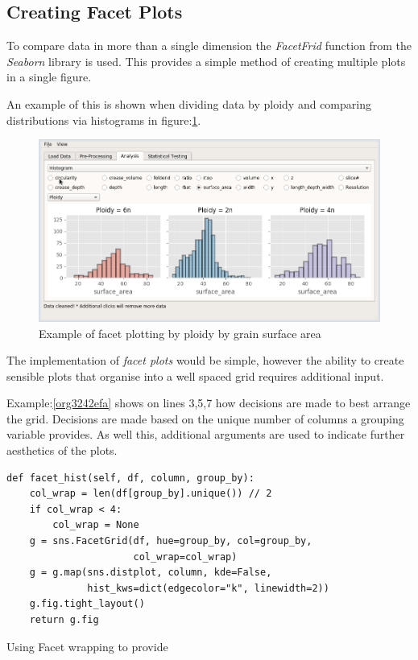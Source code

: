 \documentclass[11pt]{report}
\begin{document}
\clearpage
\subsection{Creating Facet Plots}
\label{sec:org64ee1f3}

To compare data in more than a single dimension the \emph{FacetFrid} function from the \emph{Seaborn} library is used. This provides a simple method of creating multiple plots in a single figure.

An example of this is shown when dividing data by ploidy and comparing distributions via histograms in figure:\ref{fig:org9b28f10}.

\begin{figure}[htbp]
\centering
\includegraphics[width=12cm]{./images/facet_example.png}
\caption{\label{fig:org9b28f10}
Example of facet plotting by ploidy by grain surface area}
\end{figure}

The implementation of \emph{facet plots} would be simple, however the ability to create sensible plots that organise into a well spaced grid requires additional input.

Example:\ref{org3242efa} shows on lines 3,5,7 how decisions are made to best arrange the grid. Decisions are made based on the unique number of columns a grouping variable provides. As well this,  additional arguments are  used to indicate further aesthetics of the plots.

\begin{listing}[htbp]
\begin{verbatim}
def facet_hist(self, df, column, group_by):
    col_wrap = len(df[group_by].unique()) // 2
    if col_wrap < 4:
        col_wrap = None
    g = sns.FacetGrid(df, hue=group_by, col=group_by,
                      col_wrap=col_wrap)
    g = g.map(sns.distplot, column, kde=False,
              hist_kws=dict(edgecolor="k", linewidth=2))
    g.fig.tight_layout()
    return g.fig
\end{verbatim}
\caption{\label{org3242efa}
Using Facet wrapping to provide}
\end{listing}
\end{document}
